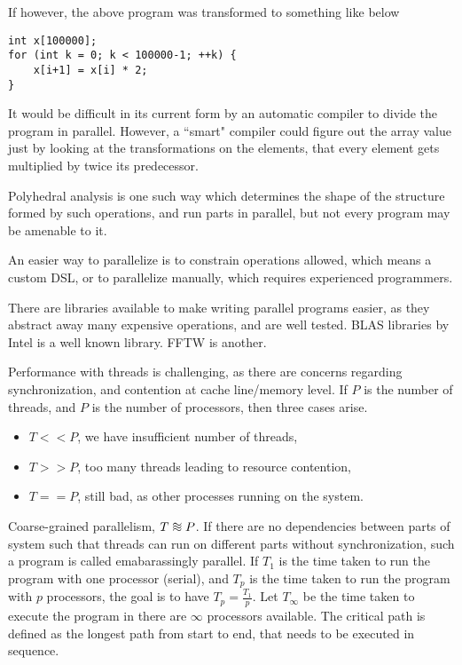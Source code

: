 \documentclass{article}
\newcommand*{\approxident}{%
  \mathrel{\vcenter{\offinterlineskip
  \hbox{$\sim$}\vskip-.35ex\hbox{$\sim$}\vskip-.35ex\hbox{$\sim$}}}}
\begin{document}
If however, the above program was transformed to something like below

\begin{verbatim}
int x[100000];
for (int k = 0; k < 100000-1; ++k) {
    x[i+1] = x[i] * 2;
}
\end{verbatim}

It would be difficult in its current form by an automatic compiler to divide the program in parallel.
However, a ``smart" compiler could figure out the array value just by looking at the transformations on the elements,
that every element gets multiplied by twice its predecessor.

Polyhedral analysis is one such way which determines the shape of the structure formed by such operations,
and run parts in parallel, but not every program may be amenable to it.

An easier way to parallelize is to constrain operations allowed, which means a custom DSL,
or to parallelize manually, which requires experienced programmers.

There are libraries available to make writing parallel programs easier, as they abstract away many
expensive operations, and are well tested.
BLAS libraries by Intel is a well known library. FFTW is another.


Performance with threads is challenging, as there are concerns regarding synchronization, and contention
at cache line/memory level.
If $P$ is the number of threads, and $P$ is the number of processors, then three cases arise.
\begin{itemize}
    \item $T << P$, we have insufficient number of threads,
    \item $T >> P$, too many threads leading to resource contention,
    \item $T == P$, still bad, as other processes running on the system.
\end{itemize}

Coarse-grained parallelism, $T \approxident P$.
If there are no dependencies between parts of system such that threads can run on different parts without
synchronization, such a program is called emabarassingly parallel.
If $T_1$ is the time taken to run the program with one processor (serial), and $T_p$ is the time taken to
run the program with $p$ processors, the goal is to have $T_p = \frac{T_1}{p}$.
Let $T_\infty$ be the time taken to execute the program in there are $\infty$ processors available.
The critical path is defined as the longest path from start to end, that needs to be executed in sequence.
\end{document}
